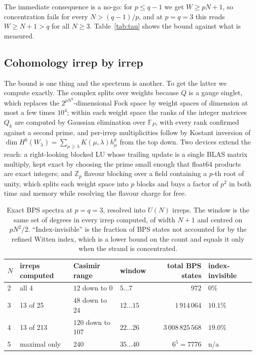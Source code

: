 \documentclass[10pt]{article}
\begin{document}
The immediate consequence is a no-go: for $p\le q-1$ we get $W\ge pN+1$, so concentration fails for every
$N>(q-1)/p$, and at $p=q=3$ this reads $W\ge N+1>q$ for all $N\ge3$. Table~\ref{tab:tau} shows the bound against
what is measured.

\subsection{Cohomology irrep by irrep}\label{sec:numerics}

The bound is one thing and the spectrum is another. To get the latter we compute exactly. The complex splits
over weights because $Q$ is a gauge singlet, which replaces the $2^{pN^2}$-dimensional Fock space by weight
spaces of dimension at most a few times $10^4$; within each weight space the ranks of the integer matrices
$Q_k$ are computed by Gaussian elimination over $\mathbb F_P$, with every rank confirmed against a second prime,
and per-irrep multiplicities follow by Kostant inversion of
$\dim H^k(W_\lambda)=\sum_{\mu\ge\lambda}K(\mu,\lambda)h^k_\mu$ from the top down. Two devices extend the reach:
a right-looking blocked LU whose trailing update is a single BLAS matrix multiply, kept exact by choosing the
prime small enough that float64 products are exact integers; and $\mathbb Z_p$ flavour blocking over a field
containing a $p$-th root of unity, which splits each weight space into $p$ blocks and buys a factor of $p^2$ in
both time and memory while resolving the flavour charge for free.

\begin{table}[t]\centering\small
\begin{tabular}{llllrl}
\toprule
$N$ & irreps computed & Casimir range & window & total BPS states & index-invisible\\
\midrule
2 & all 4 & $12$ down to $0$ & $5\ldots7$ & $972$ & $0\%$\\
3 & 13 of 25 & $48$ down to $24$ & $12\ldots15$ & $1\,914\,064$ & $10.1\%$\\
4 & 13 of 213 & $120$ down to $107$ & $22\ldots26$ & $3\,008\,825\,568$ & $19.0\%$\\
5 & maximal only & $240$ & $35\ldots40$ & $6^5=7776$ & n/a\\
\bottomrule
\end{tabular}
\caption{Exact BPS spectra at $p=q=3$, resolved into $U(N)$ irreps. The window is the same set of degrees in
every irrep computed, of width $N+1$ and centred on $pN^2/2$. ``Index-invisible'' is the fraction of BPS states
not accounted for by the refined Witten index, which is a lower bound on the count and equals it only when the
strand is concentrated.}
\label{tab:cohom}
\end{table}
\end{document}
